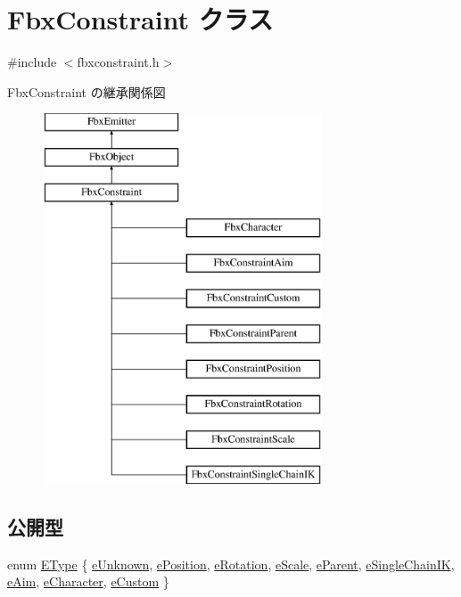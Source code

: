 \hypertarget{class_fbx_constraint}{}\section{Fbx\+Constraint クラス}
\label{class_fbx_constraint}


{\ttfamily \#include $<$fbxconstraint.\+h$>$}

Fbx\+Constraint の継承関係図\begin{figure}[H]
\begin{center}
\leavevmode
\includegraphics[height=11.000000cm]{class_fbx_constraint}
\end{center}
\end{figure}
\subsection*{公開型}
\begin{DoxyCompactItemize}
\item 
enum \hyperlink{class_fbx_constraint_a49c1634663395eab7c28856df233ec66}{E\+Type} \{ \newline
\hyperlink{class_fbx_constraint_a49c1634663395eab7c28856df233ec66a1f5c6c9045cb37f8e33ab54d41b628f2}{e\+Unknown}, 
\hyperlink{class_fbx_constraint_a49c1634663395eab7c28856df233ec66a1be363288f8d920cf30cffaa7cdef010}{e\+Position}, 
\hyperlink{class_fbx_constraint_a49c1634663395eab7c28856df233ec66a99a284f64e965cb86f9a3550a99b3160}{e\+Rotation}, 
\hyperlink{class_fbx_constraint_a49c1634663395eab7c28856df233ec66a64de25b844a25f3723f7cb0dbaa4f27a}{e\+Scale}, 
\newline
\hyperlink{class_fbx_constraint_a49c1634663395eab7c28856df233ec66a243a8e5ff104cc018d76fd60d82ad5ef}{e\+Parent}, 
\hyperlink{class_fbx_constraint_a49c1634663395eab7c28856df233ec66a849661b75a2235ba1b244bc8ee8d9509}{e\+Single\+Chain\+IK}, 
\hyperlink{class_fbx_constraint_a49c1634663395eab7c28856df233ec66a6d6fcad832cbbab74f171c5b6fa46ba1}{e\+Aim}, 
\hyperlink{class_fbx_constraint_a49c1634663395eab7c28856df233ec66ad04946a8d6506e255a01521277db52f0}{e\+Character}, 
\newline
\hyperlink{class_fbx_constraint_a49c1634663395eab7c28856df233ec66ab7e7b731132836a4bb94b9be642cd861}{e\+Custom}
 \}
\end{DoxyCompactItemize}
